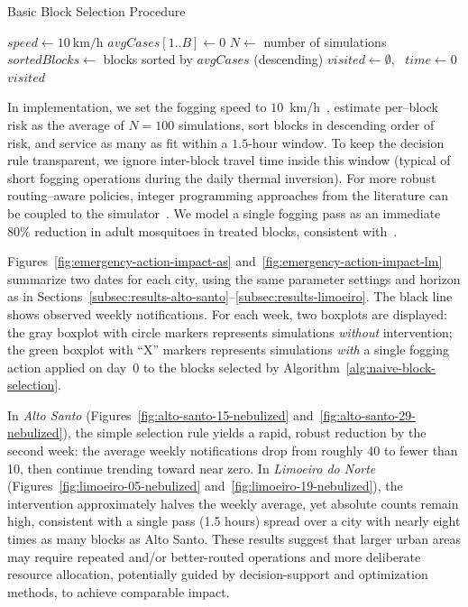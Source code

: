 \begin{algorithm}[h!]
\caption{Basic Block Selection Procedure}\label{alg:naive-block-selection}
\BlankLine
$speed \gets 10\ \text{km/h}$\; 
$avgCases[1..B] \gets 0$\; 
$N \gets$ number of simulations\;
$sortedBlocks \gets$ blocks sorted by $avgCases$ (descending)\;
$visited \gets \emptyset$, \ $time \gets 0$\;
\Return $visited$
\end{algorithm}

In implementation, we set the fogging speed to $10$~km/h~\cite{brasil-dept-helth:2009}, estimate per–block risk as the average of $N\!=\!100$ simulations, sort blocks in descending order of risk, and service as many as fit within a $1.5$-hour window. To keep the decision rule transparent, we ignore inter-block travel time inside this window (typical of short fogging operations during the daily thermal inversion). For more robust routing–aware policies, integer programming approaches from the literature can be coupled to the simulator~\cite{araujo:2022,andrade:2021}. We model a single fogging pass as an immediate $80\%$ reduction in adult mosquitoes in treated blocks, consistent with~\cite{brasil-dept-helth:2009}.

Figures~\ref{fig:emergency-action-impact-as} and~\ref{fig:emergency-action-impact-lm} summarize two dates for each city, using the same parameter settings and horizon as in Sections~\ref{subsec:results-alto-santo}–\ref{subsec:results-limoeiro}. The black line shows observed weekly notifications. For each week, two boxplots are displayed: the gray boxplot with circle markers represents simulations \emph{without} intervention; the green boxplot with “X” markers represents simulations \emph{with} a single fogging action applied on day~0 to the blocks selected by Algorithm~\ref{alg:naive-block-selection}.

In \textit{Alto Santo} (Figures~\ref{fig:alto-santo-15-nebulized} and~\ref{fig:alto-santo-29-nebulized}), the simple selection rule yields a rapid, robust reduction by the second week: the average weekly notifications drop from roughly 40 to fewer than 10, then continue trending toward near zero. In \textit{Limoeiro do Norte} (Figures~\ref{fig:limoeiro-05-nebulized} and~\ref{fig:limoeiro-19-nebulized}), the intervention approximately halves the weekly average, yet absolute counts remain high, consistent with a single pass (1.5 hours) spread over a city with nearly eight times as many blocks as Alto Santo. These results suggest that larger urban areas may require repeated and/or better-routed operations and more deliberate resource allocation, potentially guided by decision-support and optimization methods, to achieve comparable impact.

